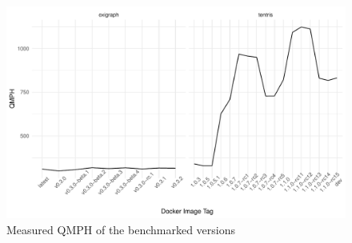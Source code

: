 \begin{figure}[tbph]
	\centering
	\includegraphics[width=.8\textwidth]{figures/QMPH.pdf}
	\caption{Measured QMPH of the benchmarked \ts{} versions}
	\label{fig:QMPH}
\end{figure}











